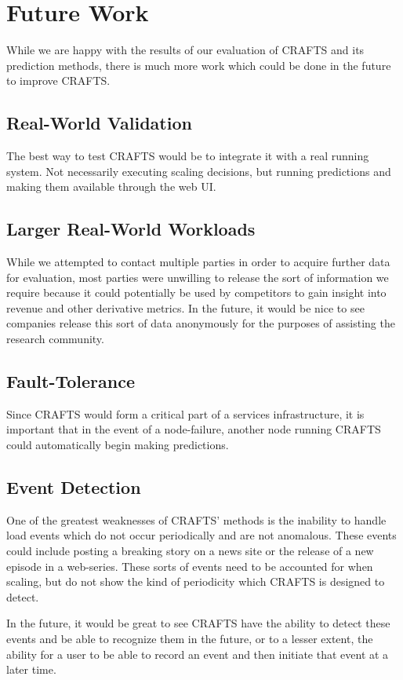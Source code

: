 \chapter{Future Work}
While we are happy with the results of our evaluation of CRAFTS and its prediction methods, there is much more work which could be done in the future to improve CRAFTS.

\section{Real-World Validation}
The best way to test CRAFTS would be to integrate it with a real running system. Not necessarily executing scaling decisions, but running predictions and making them available through the web UI.

\section{Larger Real-World Workloads}
While we attempted to contact multiple parties in order to acquire further data for evaluation, most parties were unwilling to release the sort of information we require because it could potentially be used by competitors to gain insight into revenue and other derivative metrics. In the future, it would be nice to see companies release this sort of data anonymously for the purposes of assisting the research community.

\section{Fault-Tolerance}
Since CRAFTS would form a critical part of a services infrastructure, it is important that in the event of a node-failure, another node running CRAFTS could automatically begin making predictions.

\section{Event Detection}
One of the greatest weaknesses of CRAFTS' methods is the inability to handle load events which do not occur periodically and are not anomalous. These events could include posting a breaking story on a news site or the release of a new episode in a web-series. These sorts of events need to be accounted for when scaling, but do not show the kind of periodicity which CRAFTS is designed to detect.

In the future, it would be great to see CRAFTS have the ability to detect these events and be able to recognize them in the future, or to a lesser extent, the ability for a user to be able to record an event and then initiate that event at a later time.

